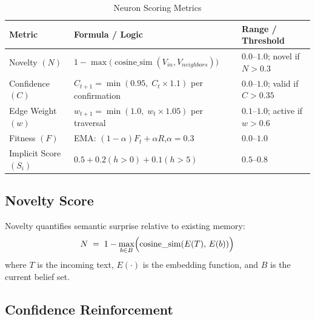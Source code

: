 \documentclass[11pt,a4paper]{article}
\begin{document}
\begin{table}[h!]
\centering
\caption{Neuron Scoring Metrics}
\label{tab:scores}
\begin{tabular}{@{} p{2.8cm} p{7.8cm} p{3.2cm} @{}}
    \toprule
    \textbf{Metric}           & \textbf{Formula / Logic}
                              & \textbf{Range / Threshold}          \\
    \midrule
    Novelty $(N)$
        & $\displaystyle 1 - \max\!\bigl(\operatorname{cosine\_sim}
            (V_{\!in},V_{\!neighbors})\bigr)$
        & $0.0$--$1.0$; novel if $N>0.3$          \\[8pt]

    Confidence $(C)$
        & $C_{t+1} = \min(0.95,\;C_t \times 1.1)$ per confirmation
        & $0.0$--$1.0$; valid if $C>0.35$         \\[8pt]

    Edge Weight $(w)$
        & $w_{t+1} = \min(1.0,\;w_t\times 1.05)$ per traversal
        & $0.1$--$1.0$; active if $w>0.6$         \\[8pt]

    Fitness $(F)$
        & EMA: $(1-\alpha)F_t + \alpha R$,\quad $\alpha=0.3$
        & $0.0$--$1.0$                             \\[8pt]

    Implicit Score $(S_i)$& $0.5 + 0.2(h>0) + 0.1(h>5)$
        & $0.5$--$0.8$                             \\
    \bottomrule
\end{tabular}
\end{table}

\subsection{Novelty Score}

Novelty quantifies semantic surprise relative to existing memory:
\[
    N \;=\; 1 - \max_{b \in B}\Bigl(\operatorname{cosine\_sim}(E(T),\,E(b))\Bigr)
\]
where $T$ is the incoming text, $E(\cdot)$ is the embedding function, and $B$ is the
current belief set.

\subsection{Confidence Reinforcement}
\end{document}
